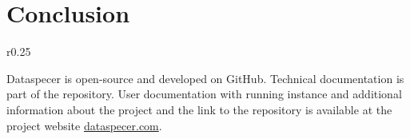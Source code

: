\chapter*{Conclusion}



\vfill

\bigskip

\begin{wrapfigure}{r}{0.25\textwidth}
    \centering
    \vspace{-\intextsep}
    \hspace*{-.75\columnsep}
\end{wrapfigure}
Dataspecer is open-source and developed on GitHub. Technical documentation is part of the repository. User documentation with running instance and additional information about the project and the link to the repository is available at the project website \url{dataspecer.com}.

\vfill